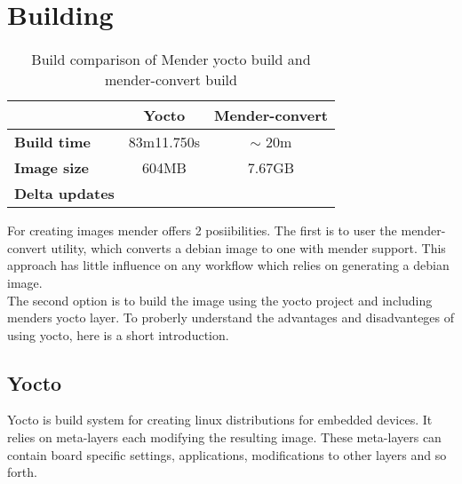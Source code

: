 \documentclass[../../main.tex]{subfiles}
\begin{document}
\section{Building}%
\label{sec:building}

\begin{table}[h]
	\centering
	\caption{Build comparison of Mender yocto build and mender-convert build}
	\label{tab:build_comp}
	\begin{tabular}{l|cc}
		& \textbf{Yocto} & \textbf{Mender-convert}\\
		\hline
		\textbf{Build time}&83m11.750s& $\sim$ 20m \\
		\textbf{Image size}&604MB&7.67GB\\
		\textbf{Delta updates}&&
	\end{tabular}
\end{table}


For creating images mender offers 2 posiibilities.
The first is to user the mender-convert utility, which converts a debian image
to one with mender support. This approach has little influence on any workflow which relies
on generating a debian image.\\
The second option is to build the image using the yocto project and including menders yocto layer.
To proberly understand the advantages and disadvanteges of using yocto, here is a short introduction.

\subsection{Yocto}%
\label{sub:yocto}

Yocto is build system for creating linux distributions for embedded devices. It relies on meta-layers
each modifying the resulting image. These meta-layers can contain board specific settings,
applications, modifications to other layers and so forth.
\end{document}
